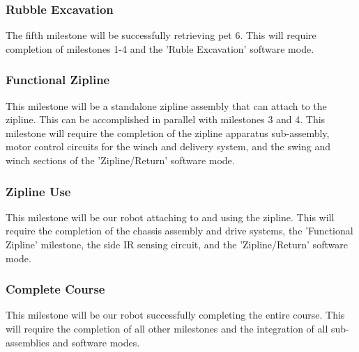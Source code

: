 \documentclass[11pt, oneside]{article} %
\begin{document}
		\subsubsection{Rubble Excavation}
		The fifth milestone will be successfully retrieving pet 6. This will require completion of milestones 1-4 and the 'Ruble Excavation' software mode.
		\subsubsection{Functional Zipline}
		This milestone will be a standalone zipline assembly that can attach to the zipline. This can be accomplished in parallel with milestones 3 and 4. This milestone will require the completion of the zipline apparatus sub-assembly, motor control circuits for the winch and delivery system, and the swing and winch sections of the 'Zipline/Return' software mode.
		\subsubsection{Zipline Use}
		This milestone will be our robot attaching to and using the zipline. This will require the completion of the chassis assembly and drive systems, the 'Functional Zipline' milestone, the side IR sensing circuit, and the 'Zipline/Return' software mode.
		\subsubsection{Complete Course}
		This milestone will be our robot successfully completing the entire course. This will require the completion of all other milestones and the integration of all sub-assemblies and software modes.
		
\end{document}
